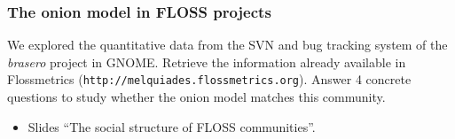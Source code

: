 \documentclass[a4paper]{article}
\begin{document}
\subsubsection{The onion model in FLOSS projects}
\label{sub:empirical-onion}
 
We explored the quantitative data from the SVN and bug tracking system of the \textit{brasero} project in GNOME. Retrieve the information
already available in Flossmetrics (\texttt{http://melquiades.flossmetrics.org}). Answer 4 concrete questions to study whether the onion model matches this community.

\begin{itemize}
\item Slides ``The social structure of FLOSS communities''.
\end{itemize}
\end{document}
